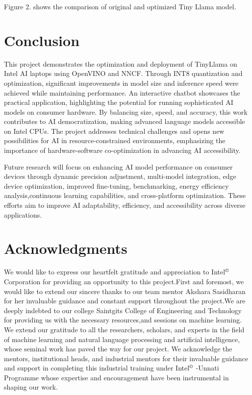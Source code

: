 \documentclass{josis}
\begin{document}
Figure 2. shows the comparison of original and optimized Tiny Llama model.
\section{Conclusion}
This project demonstrates the optimization and deployment of TinyLlama on Intel AI laptops using OpenVINO and NNCF. Through INT8 quantization and optimization, significant improvements in model size and inference speed were achieved while maintaining performance. An interactive chatbot showcases the practical application, highlighting the potential for running sophisticated AI models on consumer hardware. By balancing size, speed, and accuracy, this work contributes to AI democratization, making advanced language models accessible on Intel CPUs. The project addresses technical challenges and opens new possibilities for AI in resource-constrained environments, emphasizing the importance of hardware-software co-optimization in advancing AI accessibility.


Future research will focus on enhancing AI model performance on consumer devices through dynamic precision adjustment, multi-model integration, edge device optimization, improved fine-tuning, benchmarking, energy efficiency analysis,continuous learning capabilities, and cross-platform optimization. These efforts aim to improve AI adaptability, efficiency, and accessibility across diverse applications.
\section{Acknowledgments}
We would like to express our heartfelt gratitude and appreciation to Intel$^\copyright$ Corporation for providing an opportunity to this project.First and foremost, we would like to extend our sincere thanks to our team mentor Akshara Sasidharan for her invaluable guidance and constant support throughout the project.We are deeply indebted to our college Saintgits College of Engineering and Technology for providing us with the necessary resources,and sessions on machine learning. We extend our gratitude to all the researchers, scholars, and experts in the field of machine learning and natural language processing and artificial intelligence, whose seminal work has paved the way for our project. We acknowledge the mentors, institutional heads, and industrial mentors for their invaluable guidance and support in completing this industrial training under Intel$^\copyright$ -Unnati Programme whose expertise and encouragement have been instrumental in shaping our work.
\cite{*}


\appendix
\end{document}
